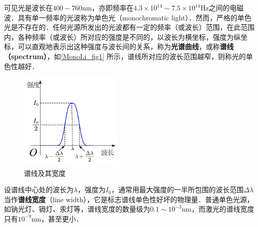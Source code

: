 

可见光是波长在$400-760\mathrm{nm}$，亦即频率在$4.3 \times 10^{14} \sim 7.5 \times 10^{14} \mathrm{Hz}$之间的电磁波．具有单一频率的光波称为单色光（monochromatic light）．然而，严格的单色光是不存在的．任何光源所发出的光波都有一定的频率（或波长）范围，在此范围内，各种频率（或波长）所对应的强度是不同的，以波长为横坐标，强度为纵坐标，可以直观地表示出这种强度与波长间的关系，称为\textbf{光谱曲线}，或称\textbf{谱线（spectrum）}，如\autoref{MonoLi_fig1} 所示，谱线所对应的波长范围越窄，则称光的单色性越好．
\begin{figure}[ht]
\centering
\includegraphics[width=5cm]{./figures/MonoLi_1.png}
\caption{谱线及其宽度} \label{MonoLi_fig1}
\end{figure}

设谱线中心处的波长为$\lambda$，强度为$I_0$，通常用最大强度的一半所包围的波长范围$\Delta\lambda$当作\textbf{谱线宽度}（line width），它是标志谱线单色性好坏的物理量．普通单色光源，如钠光灯、镉灯、汞灯等，谱线宽度的数量级为$0.1 \sim 10^{-3} \mathrm{nm}$，而激光的谱线宽度只有$10^{-9}\mathrm{nm}$，甚至更小．
